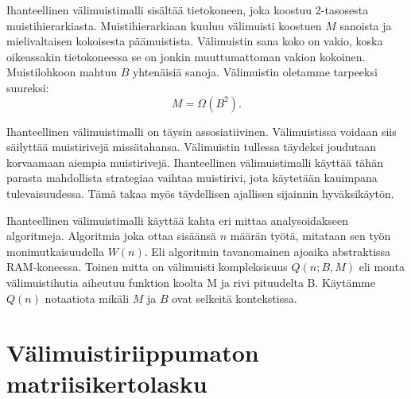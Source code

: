 \documentclass[finnish]{tktltiki2}
\theoremstyle{definition}
\theoremstyle{remark}
\begin{document}
Ihanteellinen välimuistimalli sisältää
tietokoneen, joka koostuu 2-tasosesta muistihierarkiasta. Muistihierarkiaan
kuuluu välimuisti koostuen $ M $ sanoista ja mielivaltaisen
kokoisesta päämuistista. Välimuistin sana koko on
vakio, koska oikeassakin tietokoneessa se on jonkin muuttumattoman vakion kokoinen.
Muistilohkoon mahtuu $ B $ yhtenäisiä sanoja. Välimuistin oletamme tarpeeksi suureksi:
\[
M=\Omega(B^2).
\]

Ihanteellinen välimuistimalli on täysin assosiatiivinen.
Välimuistissa voidaan siis säilyttää muistirivejä missätahansa.
Välimuistin tullessa täydeksi joudutaan korvaamaan aiempia muistirivejä.
Ihanteellinen välimuistimalli käyttää tähän parasta mahdollista strategiaa
vaihtaa muistirivi, jota käytetään kauimpana tulevaisuudessa. %
Tämä takaa myös täydellisen ajallisen sijainnin hyväksikäytön.

Ihanteellinen välimuistimalli käyttää kahta eri mittaa analysoidakseen algoritmeja.
Algoritmia joka ottaa sisäänsä $n$ määrän työtä, mitataan sen työn monimutkaisuudella $W(n)$.
Eli algoritmin tavanomainen ajoaika abstraktissa RAM-koneessa.
Toinen mitta on välimuisti kompleksisuus $Q(n;B,M)$ eli monta välimuistihutia aiheutuu funktion koolta M ja rivi pituudelta B.
Käytämme $Q(n)$ notaatiota mikäli $M$ ja $B$ ovat selkeitä kontekstissa.

















\section{Välimuistiriippumaton matriisikertolasku}


%
%
% 
%



\end{document}
